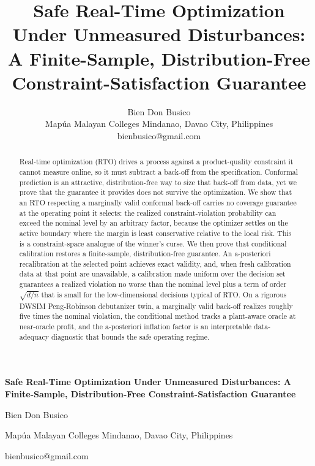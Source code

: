 \documentclass[journal]{IEEEtran}
\begin{document}
\begin{center}
{\LARGE \textbf{Safe Real-Time Optimization Under Unmeasured Disturbances: A Finite-Sample, Distribution-Free Constraint-Satisfaction Guarantee}}

\vspace{6pt}
{\large Bien Don Busico}

Map\'ua Malayan Colleges Mindanao, Davao City, Philippines

bienbusico@gmail.com
\end{center}



\title{Safe Real-Time Optimization Under Unmeasured Disturbances:\\
A Finite-Sample, Distribution-Free Constraint-Satisfaction Guarantee}

\author{Bien Don Busico \\ Map\'ua Malayan Colleges Mindanao, Davao City, Philippines \\ bienbusico@gmail.com}


\maketitle

\begin{abstract}
Real-time optimization (RTO) drives a process against a product-quality constraint it cannot
measure online, so it must subtract a back-off from the specification. Conformal prediction is
an attractive, distribution-free way to size that back-off from data, yet we prove that the
guarantee it provides does not survive the optimization. We show that an RTO respecting a
marginally valid conformal back-off carries no coverage guarantee at the operating point it
selects: the realized constraint-violation probability can exceed the nominal level by an
arbitrary factor, because the optimizer settles on the active boundary where the margin is
least conservative relative to the local risk. This is a constraint-space analogue of the
winner's curse. We then prove that conditional calibration restores a finite-sample,
distribution-free guarantee. An a-posteriori recalibration at the selected point achieves exact
validity, and, when fresh calibration data at that point are unavailable, a calibration made
uniform over the decision set guarantees a realized violation no worse than the nominal level
plus a term of order $\sqrt{d/n}$ that is small for the low-dimensional decisions typical of
RTO. On a rigorous DWSIM Peng-Robinson debutanizer twin, a marginally valid back-off realizes
roughly five times the nominal violation, the conditional method tracks a plant-aware oracle at
near-oracle profit, and the a-posteriori inflation factor is an interpretable data-adequacy
diagnostic that bounds the safe operating regime.
\end{abstract}
\end{document}
